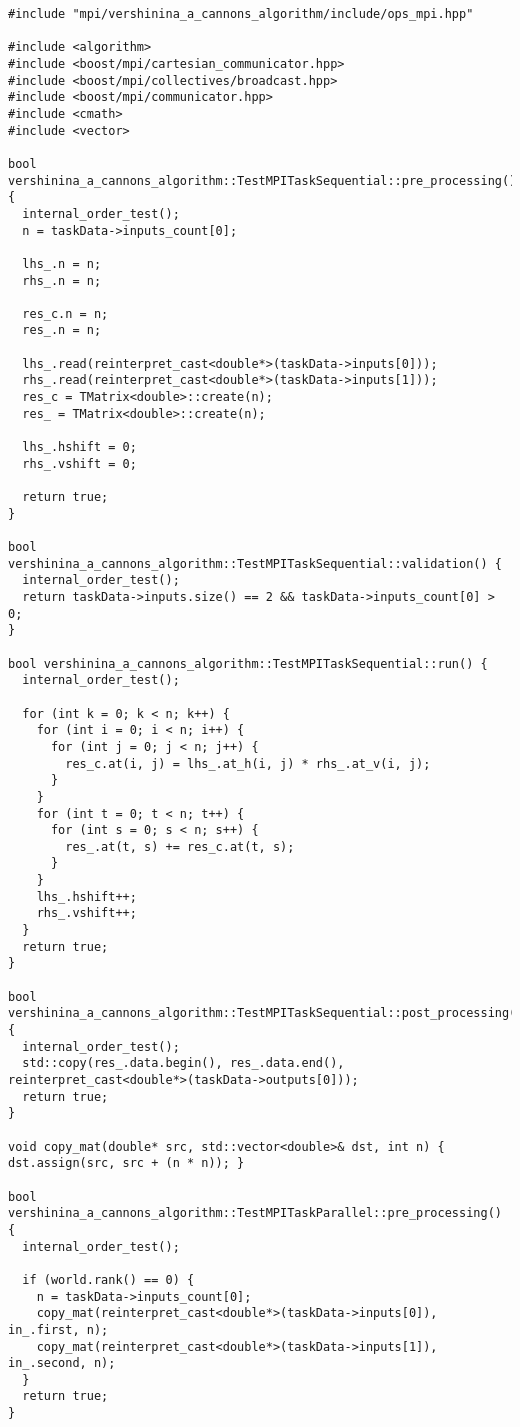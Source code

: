 \documentclass[12pt]{article}
\begin{document}
\begin{lstlisting}
#include "mpi/vershinina_a_cannons_algorithm/include/ops_mpi.hpp"

#include <algorithm>
#include <boost/mpi/cartesian_communicator.hpp>
#include <boost/mpi/collectives/broadcast.hpp>
#include <boost/mpi/communicator.hpp>
#include <cmath>
#include <vector>

bool vershinina_a_cannons_algorithm::TestMPITaskSequential::pre_processing() {
  internal_order_test();
  n = taskData->inputs_count[0];

  lhs_.n = n;
  rhs_.n = n;

  res_c.n = n;
  res_.n = n;

  lhs_.read(reinterpret_cast<double*>(taskData->inputs[0]));
  rhs_.read(reinterpret_cast<double*>(taskData->inputs[1]));
  res_c = TMatrix<double>::create(n);
  res_ = TMatrix<double>::create(n);

  lhs_.hshift = 0;
  rhs_.vshift = 0;

  return true;
}

bool vershinina_a_cannons_algorithm::TestMPITaskSequential::validation() {
  internal_order_test();
  return taskData->inputs.size() == 2 && taskData->inputs_count[0] > 0;
}

bool vershinina_a_cannons_algorithm::TestMPITaskSequential::run() {
  internal_order_test();

  for (int k = 0; k < n; k++) {
    for (int i = 0; i < n; i++) {
      for (int j = 0; j < n; j++) {
        res_c.at(i, j) = lhs_.at_h(i, j) * rhs_.at_v(i, j);
      }
    }
    for (int t = 0; t < n; t++) {
      for (int s = 0; s < n; s++) {
        res_.at(t, s) += res_c.at(t, s);
      }
    }
    lhs_.hshift++;
    rhs_.vshift++;
  }
  return true;
}

bool vershinina_a_cannons_algorithm::TestMPITaskSequential::post_processing() {
  internal_order_test();
  std::copy(res_.data.begin(), res_.data.end(), reinterpret_cast<double*>(taskData->outputs[0]));
  return true;
}

void copy_mat(double* src, std::vector<double>& dst, int n) { dst.assign(src, src + (n * n)); }

bool vershinina_a_cannons_algorithm::TestMPITaskParallel::pre_processing() {
  internal_order_test();

  if (world.rank() == 0) {
    n = taskData->inputs_count[0];
    copy_mat(reinterpret_cast<double*>(taskData->inputs[0]), in_.first, n);
    copy_mat(reinterpret_cast<double*>(taskData->inputs[1]), in_.second, n);
  }
  return true;
}


\end{lstlisting}
\end{document}
